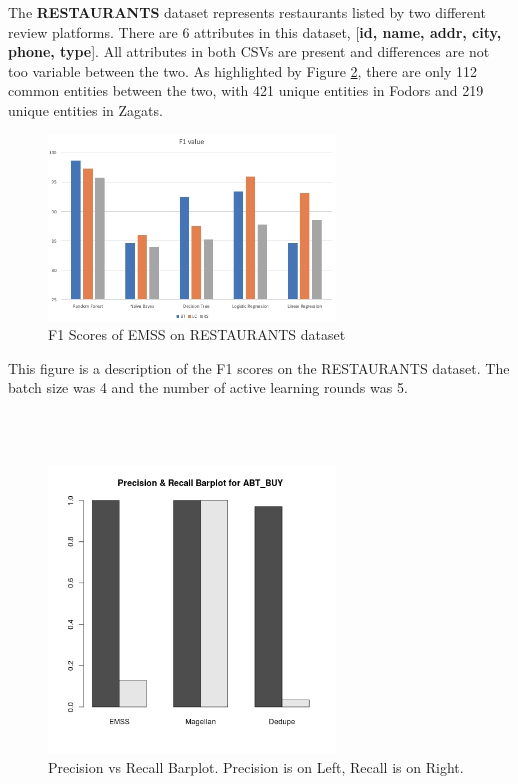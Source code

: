 \documentclass[letterpaper,twocolumn,10pt]{article}
\begin{document}
The \textbf{RESTAURANTS} dataset represents restaurants listed by two different review platforms. There are 6 attributes in this dataset, [\textbf{id, name, addr, city, phone, type}]. All attributes in both CSVs are present and differences are not too variable between the two. As highlighted by Figure \ref{fig:restaurants-png}, there are only 112 common entities between the two, with 421 unique entities in Fodors and 219 unique entities in Zagats.


\begin{figure}[H]
\centering
\includegraphics[width=3in]{figures/figure_1_f1.jpg}
\caption{F1 Scores of EMSS on RESTAURANTS dataset}
\label{fig:restaurants-png}
\end{figure}

This figure is a description of the F1 scores on the RESTAURANTS dataset. The batch size was 4 and the number of active learning rounds was 5. 


\noindent{}
\\\\

\begin{figure}[H]
\centering
\includegraphics[width=3in]{figures/figure_2_barplot.png}
\caption{Precision vs Recall Barplot. Precision is on Left, Recall is on Right.}
\label{fig:restaurants-png}
\end{figure}
\end{document}
